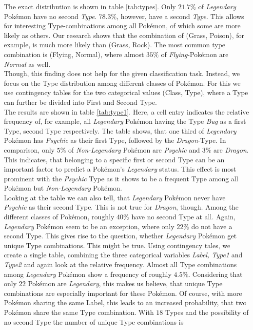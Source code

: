 \documentclass[conference]{IEEEtran}
\begin{document}
The exact distribution is shown in table \ref{tab:types}. Only $21.7\%$ of \textit{Legendary} Pokémon have no second \textit{Type}. $78.3\%$, however, have a second \textit{Type}. This allows for interesting Type-combinations among all Pokémon, of which some are more likely as others. Our research shows that the combination of (Grass, Poison), for example, is much more likely than (Grass, Rock). The most common type combination is (Flying, Normal), where almost $35\%$ of \textit{Flying}-Pokémon are \textit{Normal} as well.\\
Though, this finding does not help for the given classification task. Instead, we focus on the Type distribution among different classes of Pokémon. For this we use contingency tables for the two categorical values (Class, Type), where a Type can further be divided into First and Second Type.\\
The results are shown in table \ref{tab:type1}. Here, a cell entry indicates the relative frequency of, for example, all \textit{Legendary} Pokémon having the Type \textit{Bug} as a first Type, second Type respectively. The table shows, that one third of \textit{Legendary} Pokémon has \textit{Psychic} as their first Type, followed by the \textit{Dragon}-Type. In comparison, only $5\%$ of \textit{Non-Legendary} Pokémon are \textit{Psychic} and $3\%$ are \textit{Dragon}. This indicates, that belonging to a specific first or second Type can be an important factor to predict a Pokémon's \textit{Legendary} status. This effect is most prominent with the \textit{Psychic} Type as it shows to be a frequent Type among all Pokémon but \textit{Non-Legendary} Pokémon.\\
Looking at the table we can also tell, that \textit{Legendary} Pokémon never have \textit{Psychic} as their second Type. This is not true for \textit{Dragon}, though. Among the different classes of Pokémon, roughly $40\%$ have no second Type at all. Again, \textit{Legendary} Pokémon seem to be an exception, where only $22\%$ do not have a second Type. This gives rise to the question, whether \textit{Legendary} Pokémon get unique Type combinations. This might be true. Using contingency tales, we create a single table, combining the three categorical variables \textit{Label, Type1} and \textit{Type2} and again look at the relative frequency. Almost all Type combinations among \textit{Legendary} Pokémon show a frequency of roughly $4.5\%$. Considering that only $22$ Pokémon are \textit{Legendary}, this makes us believe, that unique Type combinations are especially important for these Pokémon. Of course, with more Pokémon sharing the same Label, this leads to an increased probability, that two Pokémon share the same Type combination. With $18$ Types and the possibility of no second Type the number of unique Type combinations is
\end{document}
